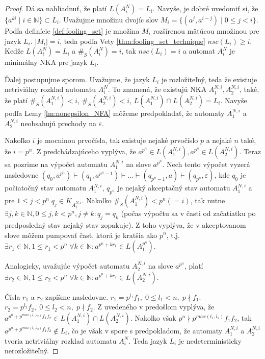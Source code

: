 \begin{proof}
Dá sa nahliadnuť, že platí $ L(A_i^N) = L_i $. Navyše, je dobré uvedomiť si, že $ \lbrace a^{ki} \; | \; i \in \mathbb{N} \rbrace \subset L_i $. Uvažujme množinu dvojíc slov $ M_i = \lbrace (a^j,a^{i-j}) \; | \; 0 \leq j < i  \rbrace $. Podľa definície \ref{def:fooling_set} je množina $ M_i $ rozšírenou mätúcou množinou pre jazyk $ L_i $. $ |M_i|=i $, teda podľa Vety \ref{thm:fooling_set_technique} $ nsc(L_i) \geq i $. Kedže $ L(A_i^N) = L_i $ a $ \#_S(A_i^N) = i $, tak $nsc(L_i) = i $ a automat $ A_i^N $ je minimálny NKA pre jazyk $ L_i $.
\par
Ďalej postupujme sporom. Uvažujme, že jazyk $ L_{i} $ je rozložiteľný, teda že existuje netriviálny rozklad automatu $ A_i^N $. To znamená, že existujú NKA $ A_1^{N,i}, A_2^{N,i} $, také, že platí $ \#_S(A_1^{N,i}) < i $, $ \#_S(A_2^{N,i}) < i $, $ L(A_1^{N,i}) \cap L(A_2^{N,i}) = L_i $. Navyše podľa Lemy \ref{lm:nonepsilon_NFA} môžeme predpokladať, že automaty $ A_1^{N,i}$ a $ A_2^{N,i} $ neobsahujú prechody na $ \varepsilon $. 
\par
Nakoľko $ i $ je mocninou prvočísla, tak existuje nejaké prvočíslo $ p $ a nejaké $ n $ také, že $ i=p^n $. Z predchádzajúceho vyplýva, že $ a^{p^n} \in L(A_1^{N,i}), a^{p^n} \in L(A_2^{N,i})$. Teraz sa pozrime na výpočet automatu $ A_1^{N,i} $ na slove $ a^{p^n} $. Nech tento výpočet vyzerá nasledovne $ (q_0,a^{p^n}) \vdash (q_1,a^{p^n-1}) \vdash \dots \vdash (q_{p^n-1},a) \vdash (q_{p^n},\varepsilon) $, kde $ q_0 $ je počiatočný stav automatu $ A_1^{N,i} $, $ q_{p^n} $ je nejaký akceptačný stav automatu $ A_1^{N,i} $ a pre $ 1 \leq j < p^n \; q_j \in K_{A_1^{N,i}}$. Nakolko $ \#_S(A_1^{N,i}) < p^n(=i) $, tak nutne $ \exists j,k \in \mathbb{N}, 0 \leq j,k < p^n, j \neq k: q_j = q_k $ (počas výpočtu sa v časti \glqq{}od začatiatku po predposledný stav\grqq{} nejaký stav zopakuje). Z toho vyplýva, že v akceptovanom slove môžem pumpovať časť, ktorá je kratšia ako $ p^n $, t.j. $ \exists r_1 \in \mathbb{N}, 1 \leq r_1 < p^n \; \forall k \in \mathbb{N}: a^{p^n+kr_1} \in L(A_1^{p^n})$. 
\par
Analogicky, uvažujúc výpočet automatu $ A_2^{N,i} $ na slove $ a^{p^n} $, platí $ \exists r_2 \in \mathbb{N}, 1 \leq r_2 < p^n \; \forall k \in \mathbb{N}: a^{p^n+kr_2} \in L(A_2^{N,i})$.
\par
Čísla $ r_1 $ a $ r_2 $ zapíšme nasledovne. $ r_1 = p^{l_1}f_1, \; 0 \leq l_1 < n, \; p \nmid f_1 $. $ r_2 = p^{l_2}f_2, \; 0 \leq l_2 < n, \; p \nmid f_2 $. Z uvedeného v predošlom vyplýva, že $ a^{p^n + p^{max(l_1,l_2)}f_1f_2} \in L(A_1^{N,i}) \cap L(A_2^{N,i}) $. Nakolko však $ p^n \nmid p^{max(l_1,l_2)}f_1f_2$, tak $ a^{p^n + p^{max(l_1,l_2)}f_1f_2} \notin L_{i} $, čo je však v spore s predpokladom, že automaty $ A_1^{N,i} $ a $ A_2^{N,i} $ tvoria netriviálny rozklad automatu $ A_{i}^N $. Teda jazyk $ L_i $ je nedeterministicky nerozložiteľný.

\end{proof}
